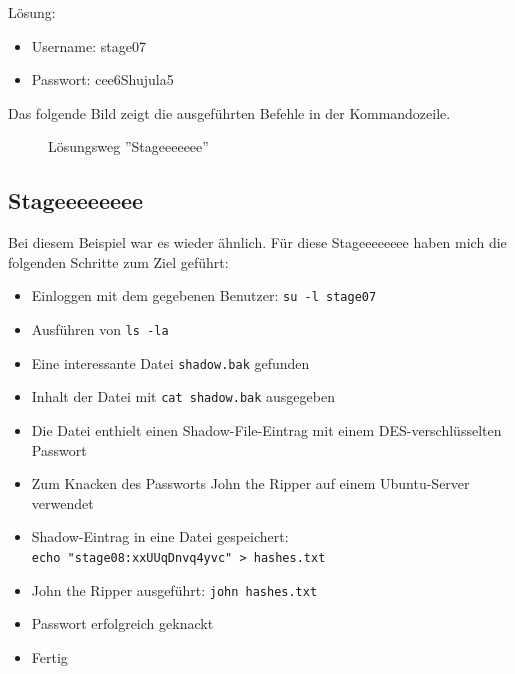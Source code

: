 \documentclass[12pt, a4paper, titlepage, oneside]{scrartcl}
\begin{document}
	Lösung:
	\begin{itemize}
		\item Username: stage07

		\item Passwort: cee6Shujula5
	\end{itemize}

	Das folgende Bild zeigt die ausgeführten Befehle in der Kommandozeile.

	\begin{figure}[h!]
		\centering
		\caption{Lösungsweg ''Stageeeeeee''}
		\label{fig:stageeeeeee_solution}
	\end{figure}

	\newpage

	\subsection{Stageeeeeeee}
	Bei diesem Beispiel war es wieder ähnlich. Für diese Stageeeeeeee haben mich
	die folgenden Schritte zum Ziel geführt:

	\begin{itemize}
		\item Einloggen mit dem gegebenen Benutzer: \lstinline{su -l stage07}

		\item Ausführen von \lstinline{ls -la}

		\item Eine interessante Datei \lstinline{shadow.bak} gefunden

		\item Inhalt der Datei mit \lstinline{cat shadow.bak} ausgegeben

		\item Die Datei enthielt einen Shadow-File-Eintrag mit einem DES-verschlüsselten
			Passwort

		\item Zum Knacken des Passworts John the Ripper auf einem Ubuntu-Server verwendet

		\item Shadow-Eintrag in eine Datei gespeichert: \\ \lstinline{echo "stage08:xxUUqDnvq4yvc" > hashes.txt}

		\item John the Ripper ausgeführt: \lstinline{john hashes.txt}

		\item Passwort erfolgreich geknackt

		\item Fertig
	\end{itemize}
\end{document}
